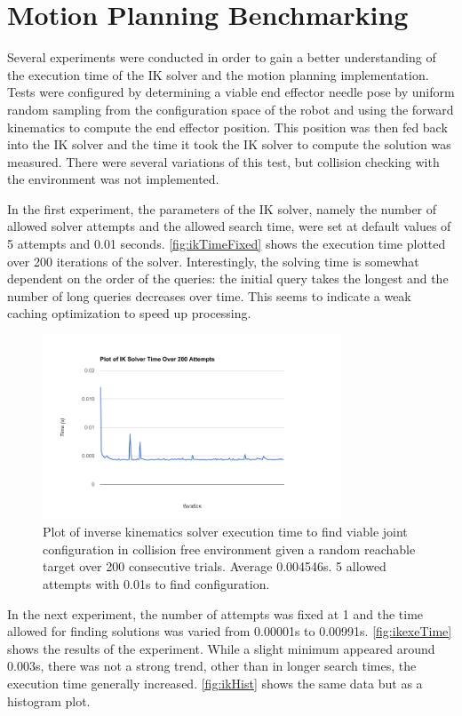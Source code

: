 \documentclass[12pt]{report}
\begin{document}
\section{Motion Planning Benchmarking}
Several experiments were conducted in order to gain a better understanding of the execution time of the IK solver and the motion planning implementation. Tests were configured by determining a viable end effector needle pose by uniform random sampling from the configuration space of the robot and using the forward kinematics to compute the end effector position. This position was then fed back into the IK solver and the time it took the IK solver to compute the solution was measured. There were several variations of this test, but collision checking with the environment was not implemented.

In the first experiment, the parameters of the IK solver, namely the number of allowed solver attempts and the allowed search time, were set at default values of 5 attempts and 0.01 seconds. \autoref{fig:ikTimeFixed} shows the execution time plotted over 200 iterations of the solver. Interestingly, the solving time is somewhat dependent on the order of the queries: the initial query takes the longest and the number of long queries decreases over time. This seems to indicate a weak caching optimization to speed up processing.

\begin{figure}[thpb]
	\centering
	\includegraphics[width = 3.5in]{graphs/ik_solver_fixed_stats.png}
    \caption{Plot of inverse kinematics solver execution time to find viable joint configuration in collision free environment given a random reachable target over 200 consecutive trials. Average 0.004546s. 5 allowed attempts with 0.01s to find configuration.}
    \label{fig:ikTimeFixed}
\end{figure}

In the next experiment, the number of attempts was fixed at 1 and the time allowed for finding solutions was varied from 0.00001s to 0.00991s. \autoref{fig:ikexeTime} shows the results of the experiment. While a slight minimum appeared around 0.003s, there was not a strong trend, other than in longer search times, the execution time generally increased. \autoref{fig:ikHist} shows the same data but as a histogram plot.
\end{document}
